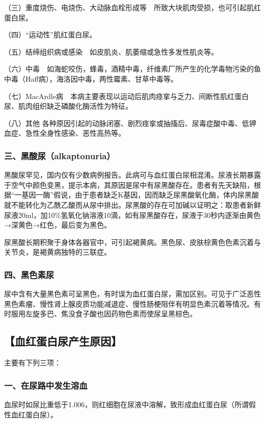 （三）重度烧伤、电烧伤、大动脉血栓形成等　所致大块肌肉受损，也可引起肌红蛋白尿。

（四）“运动性”肌红蛋白尿。

（五）结缔组织病或感染　如皮肌炎、肌萎缩或急性多发性肌炎等。

（六）中毒　如海蛇咬伤，蜂毒，酒精中毒，纤维素厂所产生的化学毒物污染的鱼中毒（Haff病），海洛因中毒，两性霉素、甘草中毒等。

（七）MacArdle病　本病主要表现以运动后肌肉痉挛与乏力、间断性肌红蛋白尿、肌肉组织缺乏磷酸化酶活性为特征。

（八）其他
各种原因引起的动脉闭塞、剧烈痉挛或抽搐后、尿毒症酸中毒、低钾血症、急性全身性感染、恶性高热等。

\subsubsection{三、黑酸尿（alkaptonuria）}

黑酸尿罕见，国内仅有少数病例报告。此病可与血红蛋白尿相混淆。尿液长期暴露于空气中颜色变黑，提示本病，其原因是尿中有尿黑酸存在。患者有先天缺陷，根据“一基因一酶”假说，由于患者缺乏K基因，因而缺乏尿黑酸氧化酶，体内尿黑酸就不能转化为乙酰乙酸而从尿中排出。尿黑酸的存在可加碱以证明之：取患者新鲜尿液20ml，加10\%氢氧化钠溶液10滴，如有尿黑酸存在，尿液于30秒内逐渐由黄色→深黄色→红色，最后变为黑色。

尿黑酸长期积聚于身体各器官中，可引起褐黄病。黑色尿、皮肤棕黄色色素沉着与关节炎，是褐黄病独特的三联症。

\subsubsection{四、黑色素尿}

尿中含有大量黑色素可呈黑色，有时误为血红蛋白尿，需加区别。可见于广泛恶性黑色素瘤、慢性肾上腺皮质功能减退症、慢性肠梗阻伴有明显色素沉着等情况。有时服用左旋多巴、焦没食子酸也因药物色素而使尿呈黑棕色。

\subsection{【血红蛋白尿产生原因】}

主要有下列三项：

\subsubsection{一、在尿路中发生溶血}

血尿时如尿比重低于1.006，则红细胞在尿液中溶解，致形成血红蛋白尿（所谓假性血红蛋白尿）。

